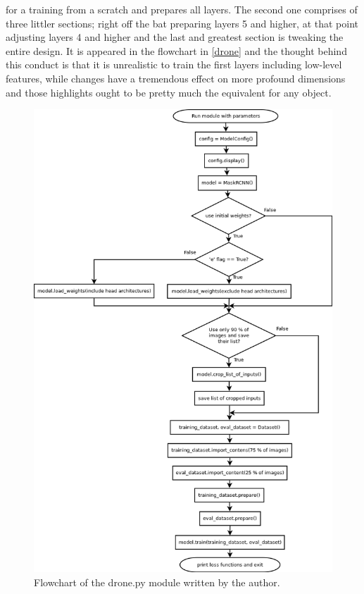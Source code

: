 for a training from a scratch and prepares all layers. The second one comprises of three littler sections; right off the bat preparing layers 5 and higher, at that point adjusting layers 4 and 
higher and the last and greatest section is tweaking the entire design. It is appeared in the flowchart in \ref{drone} and the thought behind this conduct is that it is 
unrealistic to train the first layers including low-level features, while changes have a tremendous effect on more profound dimensions and those highlights ought to be pretty much the equivalent for any object.
\clearpage
\begin{figure}[H]
  \centering
  \includegraphics[width=0.8\linewidth]{images/drone-graph.png}
  \caption{Flowchart of the drone.py module written by the author.}
 \end{figure}
 \label{drone}
 \clearpage

